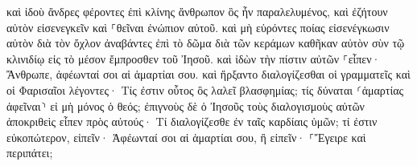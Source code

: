 \documentclass{openreader}
\begin{document}
καὶ ἰδοὺ ἄνδρες φέροντες ἐπὶ κλίνης ἄνθρωπον ὃς ἦν παραλελυμένος, καὶ ἐζήτουν αὐτὸν εἰσενεγκεῖν καὶ ⸀θεῖναι ἐνώπιον αὐτοῦ. 
καὶ μὴ εὑρόντες ποίας εἰσενέγκωσιν αὐτὸν διὰ τὸν ὄχλον ἀναβάντες ἐπὶ τὸ δῶμα διὰ τῶν κεράμων καθῆκαν αὐτὸν σὺν τῷ κλινιδίῳ εἰς τὸ μέσον ἔμπροσθεν τοῦ Ἰησοῦ. 
καὶ ἰδὼν τὴν πίστιν αὐτῶν ⸀εἶπεν· Ἄνθρωπε, ἀφέωνταί σοι αἱ ἁμαρτίαι σου. 
καὶ ἤρξαντο διαλογίζεσθαι οἱ γραμματεῖς καὶ οἱ Φαρισαῖοι λέγοντες· Τίς ἐστιν οὗτος ὃς λαλεῖ βλασφημίας; τίς δύναται ⸂ἁμαρτίας ἀφεῖναι⸃ εἰ μὴ μόνος ὁ θεός; 
ἐπιγνοὺς δὲ ὁ Ἰησοῦς τοὺς διαλογισμοὺς αὐτῶν ἀποκριθεὶς εἶπεν πρὸς αὐτούς· Τί διαλογίζεσθε ἐν ταῖς καρδίαις ὑμῶν; 
τί ἐστιν εὐκοπώτερον, εἰπεῖν· Ἀφέωνταί σοι αἱ ἁμαρτίαι σου, ἢ εἰπεῖν· ⸀Ἔγειρε καὶ περιπάτει; 
\end{document}
